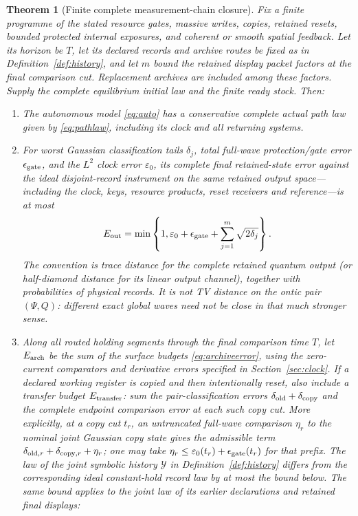 \documentclass[11pt]{article}
\newtheorem{theorem}{Theorem}[section]
\theoremstyle{definition}\newtheorem{assumption}[theorem]{Constitutive assumption}
\theoremstyle{remark}\newtheorem{remark}[theorem]{Remark}
\begin{document}
\begin{theorem}[Finite complete measurement-chain closure]\label{thm:closure}
Fix a finite programme of the stated resource gates, massive writes, copies, retained resets, bounded protected internal exposures, and coherent or smooth spatial feedback. Let its horizon be $T$, let its declared records and archive routes be fixed as in Definition~\ref{def:history}, and let $m$ bound the retained display packet factors at the final comparison cut. Replacement archives are included among these factors. Supply the complete equilibrium initial law and the finite ready stock. Then:
\begin{enumerate}
\item The autonomous model \eqref{eq:auto} has a conservative complete actual path law given by \eqref{eq:pathlaw}, including its clock and all returning systems.
\item For worst Gaussian classification tails $\delta_j$, total full-wave protection/gate error $\epsilon_{\rm gate}$, and the $L^2$ clock error $\varepsilon_0$, its complete final retained-state error against the ideal disjoint-record instrument on the same retained output space---including the clock, keys, resource products, reset receivers and reference---is at most
\begin{equation}\label{eq:totalwave}
 E_{\rm out}=\min\left\{1,\varepsilon_0+\epsilon_{\rm gate}
                                  +\sum_{j=1}^m\sqrt{2\delta_j}\right\}.
\end{equation}
The convention is trace distance for the complete retained quantum output (or half-diamond distance for its linear output channel), together with probabilities of physical records. It is not TV distance on the ontic pair $(\Psi,Q)$: different exact global waves need not be close in that much stronger sense.
\item Along all routed holding segments through the final comparison time $T$, let $E_{\rm arch}$ be the sum of the surface budgets \eqref{eq:archiveerror}, using the zero-current comparators and derivative errors specified in Section~\ref{sec:clock}. If a declared working register is copied and then intentionally reset, also include a transfer budget $E_{\rm transfer}$: sum the pair-classification errors $\delta_{\rm old}+\delta_{\rm copy}$ and the complete endpoint comparison error at each such copy cut. More explicitly, at a copy cut $t_r$, an untruncated full-wave comparison $\eta_r$ to the nominal joint Gaussian copy state gives the admissible term $\delta_{{\rm old},r}+\delta_{{\rm copy},r}+\eta_r$; one may take $\eta_r\le\varepsilon_0(t_r)+\epsilon_{\rm gate}(t_r)$ for that prefix. The law of the joint symbolic history $\mathcal Y$ in Definition~\ref{def:history} differs from the corresponding ideal constant-hold record law by at most the bound below. The same bound applies to the joint law of its earlier declarations and retained final displays:

\end{enumerate}
\end{theorem}
\end{document}
